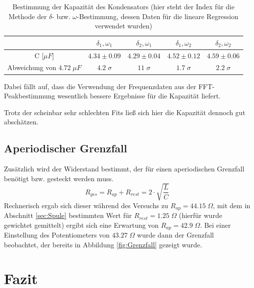 \documentclass[a4paper, 11pt]{article}
\begin{document}
\begin{table}[H]
	\centering
	\renewcommand{\arraystretch}{1.2}
	\begin{tabular}{|c|c|c|c|c|}
		\hline 
		& $\delta_{1},\omega_{1}$ & $\delta_{2},\omega_{1}$ & $\delta_{1},\omega_{2}$ & $\delta_{2},\omega_{2}$\\
		\hline 
		C [$\mu F$] & $4.34 \pm 0.09$ & $4.29 \pm 0.04$ & $4.52 \pm 0.12$ & $4.59 \pm 0.06$\\
		\hline
		Abweichung von $4.72 \;\mu F$ & $4.2\;\sigma$ & $11\;\sigma$ & $1.7\;\sigma$ & $2.2\;\sigma$ \\
		\hline
	\end{tabular}
	\label{table:KondensatorC}
	\caption{Bestimmung der Kapazität des Kondensators (hier steht der Index für die Methode der $\delta$- bzw. $\omega$-Bestimmung, dessen Daten für die lineare Regression verwendet wurden)}
\end{table}

Dabei fällt auf, dass die Verwendung der Frequenzdaten aus der FFT-Peakbestimmung wesentlich bessere Ergebnisse für die Kapazität liefert.

Trotz der scheinbar sehr schlechten Fits ließ sich hier die Kapazität dennoch gut abschätzen.

\subsection{Aperiodischer Grenzfall}
Zusätzlich wird der Widerstand bestimmt, der für einen aperiodischen Grenzfall benötigt bzw. gesteckt werden muss. 
\begin{equation}
R_{ges} = R_{ap} + R_{rest} = 2 \cdot \sqrt{\frac{L}{C}}
\end{equation}
Rechnerisch ergab sich dieser während des Versuchs zu $R_{ap} = 44.15 \;\Omega$, mit dem in Abschnitt \ref{sec:Spule} bestimmten Wert für $R_{rest} = 1.25\;\Omega$ (hierfür wurde gewichtet gemittelt) ergibt sich eine Erwartung von $R_{ap} = 42.9 \;\Omega$. Bei einer Einstellung des Potentiometers von $43.27 \;\Omega$ wurde dann der Grenzfall beobachtet, der bereits in Abbildung \ref{fig:Grenzfall} gezeigt wurde. 


\section{Fazit}

\clearpage
\listoffigures
\listoftables
\end{document}
